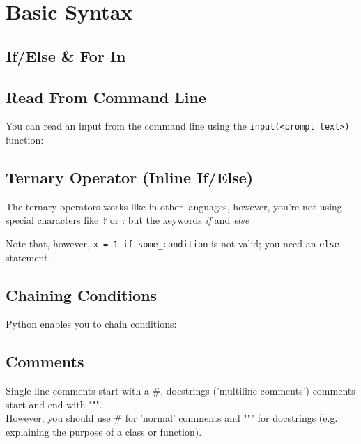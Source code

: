 \section{Basic Syntax}

    \subsection{If/Else \& For In}

    \subsection{Read From Command Line}
        You can read an input from the command line using the
        \texttt{input(<prompt text>)} function:


    \subsection{Ternary Operator (Inline If/Else)}
        The ternary operators works like in other languages, however, you're not using special
        characters like \textit{?} or \textit{:} but the keywords \textit{if} and \textit{else}

        Note that, however, \texttt{x = 1 if some_condition} is not valid; you need an
        \texttt{else} statement.

    \subsection{Chaining Conditions}
        Python enables you to chain conditions:


    \subsection{Comments}
        Single line comments start with a \#, docstrings ('multiline comments') comments start and
        end with """. \\
        However, you should use \# for 'normal' comments and """ for docstrings (e.g. explaining the
        purpose of a class or function).


